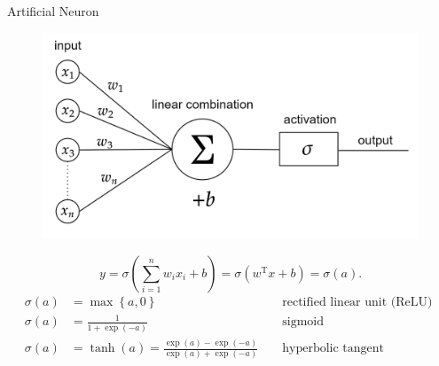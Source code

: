 \documentclass[9pt]{beamer}
\begin{document}
\begin{frame}{Artificial Neuron}
    \begin{figure}[H]
        \begin{center}
            \includegraphics[scale=0.15]{img/diagram-20220205_1.png}
        \end{center}
    \end{figure}
    \begin{equation*}
        y = \sigma \left( \sum^{n}_{i=1} w_i x_i + b \right) = \sigma \left( w^{\mathrm{T}} x + b \right) = \sigma \left(a\right).
    \end{equation*}
    \begin{equation*}
        \begin{aligned}
            \sigma \left(a \right) &=\max \left\{ a, 0 \right\} & & \text{ rectified linear unit (ReLU) } \\
            \sigma \left(a\right) &=\frac{1}{1+\exp  \left(-a\right)} & & \text{ sigmoid }  \\
            \sigma \left(a\right) &=\tanh  \left(a\right)=\frac{\exp  \left(a\right)-\exp  \left(-a\right)}{\exp  \left(a\right)+\exp  \left(-a\right)} & & \text{ hyperbolic tangent }
        \end{aligned}
    \end{equation*}
\end{frame}
\end{document}

